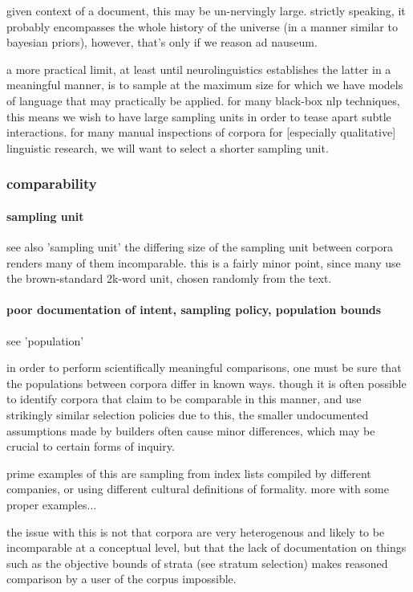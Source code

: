 given context of a document, this may be un-nervingly large.  strictly speaking, it probably encompasses the whole history of the universe (in a manner similar to bayesian priors), however, that's only if we reason ad nauseum.

a more practical limit, at least until neurolinguistics establishes the latter in a meaningful manner, is to sample at the maximum size for which we have models of language that may practically be applied.  for many black-box nlp techniques, this means we wish to have large sampling units in order to tease apart subtle interactions.  for many manual inspections of corpora for [especially qualitative] linguistic research, we will want to select a shorter sampling unit.



\subsubsection{comparability}

\paragraph{sampling unit}
see also 'sampling unit'
the differing size of the sampling unit between corpora renders many of them incomparable.  this is a fairly minor point, since many use the brown-standard 2k-word unit, chosen randomly from the text.

\paragraph{poor documentation of intent, sampling policy, population bounds}
see 'population'

in order to perform scientifically meaningful comparisons, one must be sure that the populations between corpora differ in known ways.  though it is often possible to identify corpora that claim to be comparable in this manner, and use strikingly similar selection policies due to this, the smaller undocumented assumptions made by builders often cause minor differences, which may be crucial to certain forms of inquiry.

prime examples of this are sampling from index lists compiled by different companies, or using different cultural definitions of formality.  more with some proper examples...

the issue with this is not that corpora are very heterogenous and likely to be incomparable at a conceptual level, but that the lack of documentation on things such as the objective bounds of strata (see stratum selection) makes reasoned comparison by a user of the corpus impossible.















